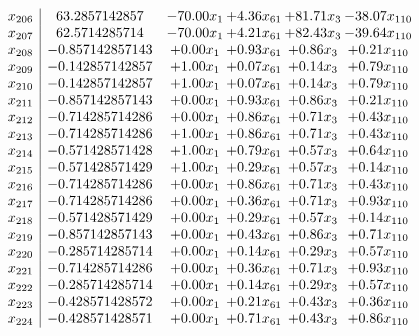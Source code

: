 \documentclass[8pt]{article}
\begin{document}
\[\begin{array}{c| c c@{\hskip 2pt} c@{\hskip 2pt} c@{\hskip 2pt} c@{\hskip 2pt} }
 x_{206}   &  63.2857142857 & -70.00 x_{1} & +  4.36 x_{61} & + 81.71 x_{3} & -38.07 x_{110}\\
 x_{207}   &  62.5714285714 & -70.00 x_{1} & +  4.21 x_{61} & + 82.43 x_{3} & -39.64 x_{110}\\
 x_{208}   &  -0.857142857143 & +  0.00 x_{1} & +  0.93 x_{61} & +  0.86 x_{3} & +  0.21 x_{110}\\
 x_{209}   &  -0.142857142857 & +  1.00 x_{1} & +  0.07 x_{61} & +  0.14 x_{3} & +  0.79 x_{110}\\
 x_{210}   &  -0.142857142857 & +  1.00 x_{1} & +  0.07 x_{61} & +  0.14 x_{3} & +  0.79 x_{110}\\
 x_{211}   &  -0.857142857143 & +  0.00 x_{1} & +  0.93 x_{61} & +  0.86 x_{3} & +  0.21 x_{110}\\
 x_{212}   &  -0.714285714286 & +  0.00 x_{1} & +  0.86 x_{61} & +  0.71 x_{3} & +  0.43 x_{110}\\
 x_{213}   &  -0.714285714286 & +  1.00 x_{1} & +  0.86 x_{61} & +  0.71 x_{3} & +  0.43 x_{110}\\
 x_{214}   &  -0.571428571428 & +  1.00 x_{1} & +  0.79 x_{61} & +  0.57 x_{3} & +  0.64 x_{110}\\
 x_{215}   &  -0.571428571429 & +  1.00 x_{1} & +  0.29 x_{61} & +  0.57 x_{3} & +  0.14 x_{110}\\
 x_{216}   &  -0.714285714286 & +  0.00 x_{1} & +  0.86 x_{61} & +  0.71 x_{3} & +  0.43 x_{110}\\
 x_{217}   &  -0.714285714286 & +  0.00 x_{1} & +  0.36 x_{61} & +  0.71 x_{3} & +  0.93 x_{110}\\
 x_{218}   &  -0.571428571429 & +  0.00 x_{1} & +  0.29 x_{61} & +  0.57 x_{3} & +  0.14 x_{110}\\
 x_{219}   &  -0.857142857143 & +  0.00 x_{1} & +  0.43 x_{61} & +  0.86 x_{3} & +  0.71 x_{110}\\
 x_{220}   &  -0.285714285714 & +  0.00 x_{1} & +  0.14 x_{61} & +  0.29 x_{3} & +  0.57 x_{110}\\
 x_{221}   &  -0.714285714286 & +  0.00 x_{1} & +  0.36 x_{61} & +  0.71 x_{3} & +  0.93 x_{110}\\
 x_{222}   &  -0.285714285714 & +  0.00 x_{1} & +  0.14 x_{61} & +  0.29 x_{3} & +  0.57 x_{110}\\
 x_{223}   &  -0.428571428572 & +  0.00 x_{1} & +  0.21 x_{61} & +  0.43 x_{3} & +  0.36 x_{110}\\
 x_{224}   &  -0.428571428571 & +  0.00 x_{1} & +  0.71 x_{61} & +  0.43 x_{3} & +  0.86 x_{110}\\

\end{array}\]
\end{document}
